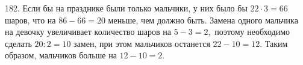 182. Если бы на празднике были только мальчики, у них было бы $22\cdot3=66$ шаров, что на $86-66=20$ меньше, чем должно быть. Замена одного мальчика на девочку увеличивает количество шаров на $5-3=2,$ поэтому необходимо сделать $20:2=10$ замен, при этом мальчиков останется $22-10=12.$ Таким образом, мальчиков больше на $12-10=2.$\\
